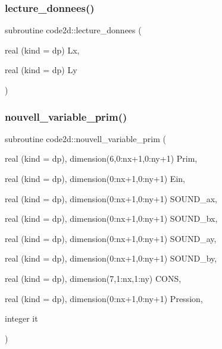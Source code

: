 \mbox{\label{main2Dv1_8f90_a7e06ba833aef7743b6a2f1be79f4bc2e}} 
\subsubsection{\texorpdfstring{lecture\+\_\+donnees()}{lecture\_donnees()}}
{\footnotesize\ttfamily subroutine code2d\+::lecture\+\_\+donnees (\begin{DoxyParamCaption}\item[{real (kind = dp)}]{Lx,  }\item[{real (kind = dp)}]{Ly }\end{DoxyParamCaption})}

\mbox{\label{main2Dv1_8f90_a7e8756401e9774b000709214edc41a76}} 
\subsubsection{\texorpdfstring{nouvell\+\_\+variable\+\_\+prim()}{nouvell\_variable\_prim()}}
{\footnotesize\ttfamily subroutine code2d\+::nouvell\+\_\+variable\+\_\+prim (\begin{DoxyParamCaption}\item[{real (kind = dp), dimension(6,0\+:nx+1,0\+:ny+1)}]{Prim,  }\item[{real (kind = dp), dimension(0\+:nx+1,0\+:ny+1)}]{Ein,  }\item[{real (kind = dp), dimension(0\+:nx+1,0\+:ny+1)}]{S\+O\+U\+N\+D\+\_\+ax,  }\item[{real (kind = dp), dimension(0\+:nx+1,0\+:ny+1)}]{S\+O\+U\+N\+D\+\_\+bx,  }\item[{real (kind = dp), dimension(0\+:nx+1,0\+:ny+1)}]{S\+O\+U\+N\+D\+\_\+ay,  }\item[{real (kind = dp), dimension(0\+:nx+1,0\+:ny+1)}]{S\+O\+U\+N\+D\+\_\+by,  }\item[{real (kind = dp), dimension(7,1\+:nx,1\+:ny)}]{C\+O\+NS,  }\item[{real (kind = dp), dimension(0\+:nx+1,0\+:ny+1)}]{Pression,  }\item[{integer}]{it }\end{DoxyParamCaption})}

